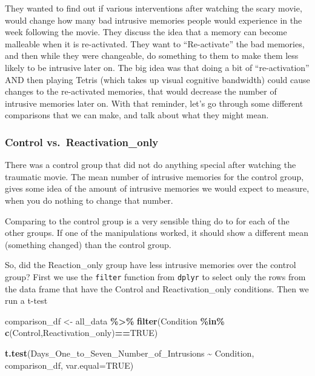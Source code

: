\documentclass[
]{book}
\newenvironment{Shaded}{\begin{snugshade}}{\end{snugshade}}
\newcommand{\AttributeTok}[1]{\textcolor[rgb]{0.13,0.29,0.53}{#1}}
\newcommand{\ConstantTok}[1]{\textcolor[rgb]{0.56,0.35,0.01}{#1}}
\newcommand{\FunctionTok}[1]{\textcolor[rgb]{0.13,0.29,0.53}{\textbf{#1}}}
\newcommand{\NormalTok}[1]{#1}
\newcommand{\OtherTok}[1]{\textcolor[rgb]{0.56,0.35,0.01}{#1}}
\newcommand{\SpecialCharTok}[1]{\textcolor[rgb]{0.81,0.36,0.00}{\textbf{#1}}}
\newcommand{\StringTok}[1]{\textcolor[rgb]{0.31,0.60,0.02}{#1}}
\begin{document}
They wanted to find out if various interventions after watching the scary movie, would change how many bad intrusive memories people would experience in the week following the movie. They discuss the idea that a memory can become malleable when it is re-activated. They want to ``Re-activate'' the bad memories, and then while they were changeable, do something to them to make them less likely to be intrusive later on. The big idea was that doing a bit of ``re-activation'' AND then playing Tetris (which takes up visual cognitive bandwidth) could cause changes to the re-activated memories, that would decrease the number of intrusive memories later on. With that reminder, let's go through some different comparisons that we can make, and talk about what they might mean.

\hypertarget{control-vs.-reactivation_only}{%
\subsubsection{Control vs.~Reactivation\_only}\label{control-vs.-reactivation_only}}

There was a control group that did not do anything special after watching the traumatic movie. The mean number of intrusive memories for the control group, gives some idea of the amount of intrusive memories we would expect to measure, when you do nothing to change that number.

Comparing to the control group is a very sensible thing do to for each of the other groups. If one of the manipulations worked, it should show a different mean (something changed) than the control group.

So, did the Reaction\_only group have less intrusive memories over the control group? First we use the \texttt{filter} function from \texttt{dplyr} to select only the rows from the data frame that have the Control and Reactivation\_only conditions. Then we run a t-test

\begin{Shaded}
\begin{Highlighting}[]
\NormalTok{comparison\_df }\OtherTok{\textless{}{-}}\NormalTok{ all\_data }\SpecialCharTok{\%\textgreater{}\%} 
                  \FunctionTok{filter}\NormalTok{(Condition }\SpecialCharTok{\%in\%} \FunctionTok{c}\NormalTok{(}\StringTok{\textquotesingle{}Control\textquotesingle{}}\NormalTok{,}\StringTok{\textquotesingle{}Reactivation\_only\textquotesingle{}}\NormalTok{)}\SpecialCharTok{==}\ConstantTok{TRUE}\NormalTok{)}
                        
\FunctionTok{t.test}\NormalTok{(Days\_One\_to\_Seven\_Number\_of\_Intrusions }\SpecialCharTok{\textasciitilde{}}\NormalTok{ Condition, }
\NormalTok{       comparison\_df,}
       \AttributeTok{var.equal=}\ConstantTok{TRUE}\NormalTok{)}
\end{Highlighting}
\end{Shaded}
\end{document}
